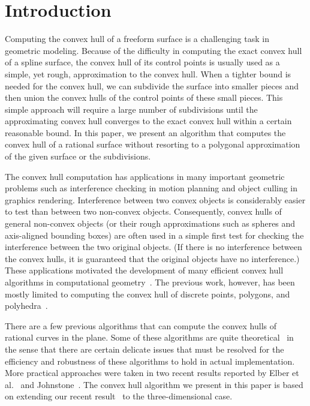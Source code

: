 \documentclass{elsart}
\begin{document}
\section{Introduction}
\label{sec-introduction}

Computing the convex hull of a freeform surface
is a challenging task in geometric modeling.
Because of the difficulty in computing the exact convex hull
of a spline surface, the convex hull of its control points is usually
used as a simple, yet rough, approximation to the convex hull.
When a tighter bound is needed for the convex hull, we can subdivide
the surface into smaller pieces and then union the convex hulls of
the control points of these small pieces. 
This simple approach will require a large number of subdivisions 
until the approximating convex hull converges to the exact convex hull
within a certain reasonable bound.  In this paper, we present
an algorithm that computes the convex hull of a rational surface
without resorting to a polygonal approximation of the given surface
or the subdivisions.

The convex hull computation has applications in many important
geometric problems such as interference checking in motion planning
and object culling in graphics rendering.  Interference between two convex
objects is considerably easier to test than between two non-convex objects.
Consequently, convex hulls of general non-convex objects (or their rough
approximations such as spheres and axis-aligned bounding boxes) are often used
in a simple first test for checking the interference between the two
original objects.   (If there is no interference between the convex hulls,
it is guaranteed that the original objects have no interference.)
These applications motivated the development of many efficient
convex hull algorithms in computational geometry~\cite{Prep85}.
The previous work, however, has been mostly limited to computing
the convex hull of discrete points, polygons, and
polyhedra~\cite{Graham83,Lee83,Prep85}.

There are a few previous algorithms that can compute the convex hulls
of rational curves in the plane.  Some of these algorithms are quite
theoretical~\cite{Kim91,Souvaine90,Schaeffer87} in the sense that
there are certain delicate issues that must be resolved for the efficiency
and robustness of these algorithms to hold in actual implementation.
More practical approaches were taken in two recent results reported
by Elber et al.~\cite{Elber2001b} and Johnstone~\cite{Johnstone2001}.
The convex hull algorithm we present in this paper is based on
extending our recent result~\cite{Elber2001b} to the three-dimensional case.
\end{document}

